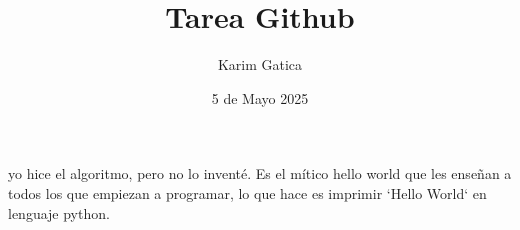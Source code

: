 \documentclass{article}
\title{Tarea Github}
\author{Karim Gatica}
\date{5 de Mayo 2025}
\begin{document}
\maketitle

yo hice el algoritmo, pero no lo inventé. Es el mítico hello world que les enseñan a todos los que empiezan a programar, lo que hace es imprimir `Hello World` en lenguaje python.
\end{document}
